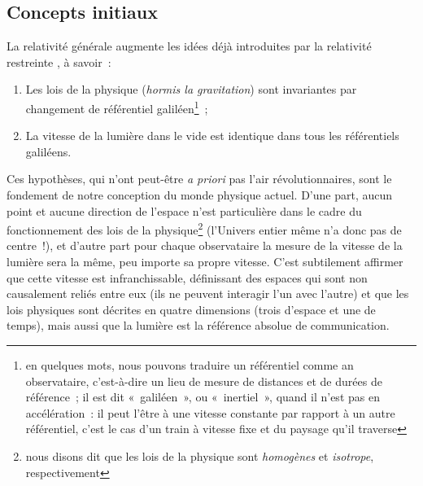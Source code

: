 \documentclass[../main/main.tex]{subfiles}
\begin{document}
\subsection{Concepts initiaux}\label{ssec:RG}

La relativité générale augmente les idées déjà introduites par la relativité
restreinte \citep[voir][et les autres articles de l'\textit{annus
mirabilis}\footnote{c'est ainsi que nous nommons l'année 1905 pendant laquelle
    \textsc{Einstein} publie quatre articles considérés comme étant à l'origine
de la physique moderne}]{einstein1905}, à savoir~:
\begin{enumerate}
    \item Les lois de la physique (\textit{hormis la gravitation}) sont
        invariantes par changement de référentiel galiléen\footnote{en quelques
            mots, nous pouvons traduire un référentiel comme an observataire,
            c'est-à-dire un lieu de mesure de distances et de durées de
            référence~; il est dit «~galiléen~», ou «~inertiel~», quand il n'est
            pas en accélération~: il peut l'être à une vitesse constante par
            rapport à un autre référentiel, c'est le cas d'un train à vitesse
        fixe et du paysage qu'il traverse}~;
    \item La vitesse de la lumière dans le vide est identique dans tous les
        référentiels galiléens.
\end{enumerate}

Ces hypothèses, qui n'ont peut-être \textit{a priori} pas l'air
révolutionnaires, sont le fondement de notre conception du monde physique
actuel. D'une part, aucun point et aucune direction de l'espace n'est
particulière dans le cadre du fonctionnement des lois de la
physique\footnote{nous disons dit que les lois de la physique sont
\textit{homogènes} et \textit{isotrope}, respectivement} (l'Univers entier même
n'a donc pas de centre~!), et d'autre part pour chaque observataire la mesure de
la vitesse de la lumière sera la même, peu importe sa propre vitesse. C'est
subtilement affirmer que cette vitesse est infranchissable, définissant des
espaces qui sont non causalement reliés entre eux (ils ne peuvent interagir l'un
avec l'autre) et que les lois physiques sont décrites en quatre dimensions
(trois d'espace et une de temps), mais aussi que la lumière est la référence
absolue de communication.
\end{document}
